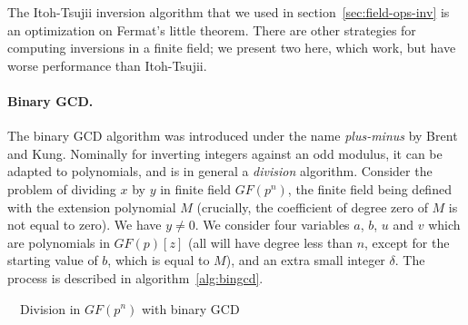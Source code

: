 \documentclass{llncs}
\newcommand{\GF}{GF}
\begin{document}
The Itoh-Tsujii inversion algorithm that we used in
section~\ref{sec:field-ops-inv} is an optimization on Fermat's little
theorem. There are other strategies for computing inversions in a finite
field; we present two here, which work, but have worse performance than
Itoh-Tsujii.

\paragraph{Binary GCD.}

The binary GCD algorithm was introduced under the name \emph{plus-minus}
by Brent and Kung\cite{BreKun1983}. Nominally for inverting integers
against an odd modulus, it can be adapted to polynomials, and is in
general a \emph{division} algorithm. Consider the problem of dividing
$x$ by $y$ in finite field $\GF(p^n)$, the finite field being defined
with the extension polynomial $M$ (crucially, the coefficient of degree
zero of $M$ is not equal to zero). We have $y\neq 0$. We consider four
variables $a$, $b$, $u$ and $v$ which are polynomials in $\GF(p)[z]$
(all will have degree less than $n$, except for the starting value of
$b$, which is equal to $M$), and an extra small integer $\delta$. The
process is described in algorithm~\ref{alg:bingcd}.

\begin{algorithm}[H]
    \caption{\ \ Division in $\GF(p^n)$ with binary GCD}\label{alg:bingcd}
    \begin{algorithmic}[1]
        \Require{$x, y \in \GF(p^n)$, $y\neq 0$, $\GF(p^n) = \GF(p)[z]/M$}
            \Else
                \State{$\delta \gets -\delta$}
            \EndIf
        \EndFor
    \end{algorithmic}
\end{algorithm}
\end{document}
